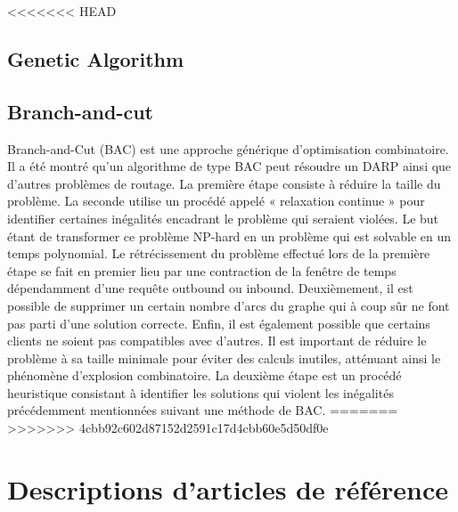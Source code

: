 \documentclass[10pt,a4paper]{report}
\begin{document}
<<<<<<< HEAD
\subsection*{Genetic Algorithm}

\subsection*{Branch-and-cut}
Branch-and-Cut (BAC) est une approche générique d'optimisation combinatoire. Il a été montré qu'un algorithme de type BAC peut résoudre un DARP ainsi que d'autres problèmes de routage. 
La première étape consiste à réduire la taille du problème. La seconde utilise un procédé appelé « relaxation continue » pour identifier certaines inégalités encadrant le problème qui seraient violées. Le but étant de transformer ce problème NP-hard en un problème qui est solvable en un temps polynomial. 
Le rétrécissement du problème effectué lors de la première étape se fait en premier lieu par une contraction de la fenêtre de temps dépendamment d'une requête outbound ou inbound. Deuxièmement, il est possible de supprimer un certain nombre d'arcs du graphe qui à coup sûr ne font pas parti d'une solution correcte. Enfin, il est également possible que certains clients ne soient pas compatibles avec d'autres. Il est important de réduire le problème à sa taille minimale pour éviter des calculs inutiles, atténuant ainsi le phénomène d'explosion combinatoire. 
La deuxième étape est un procédé heuristique consistant à identifier les solutions qui violent les inégalités précédemment mentionnées suivant une méthode de BAC. 
=======
>>>>>>> 4cbb92c602d87152d2591c17d4cbb60e5d50df0e


\section*{Descriptions d'articles de référence}
\end{document}
